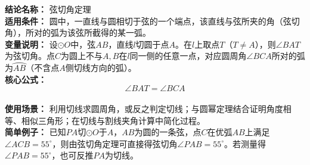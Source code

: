 \textbf{结论名称：} 弦切角定理\\
\textbf{适用条件：} 圆中，一直线与圆相切于弦的一个端点，该直线与弦所夹的角（弦切角），所对的弧为该弦所截得的某一弧。\\
\textbf{变量说明：} 设$\odot O$中，弦$AB$，直线$l$切圆于点$A$。在$l$上取点$T$（$T\neq A$），则$\angle BAT$为弦切角。点$C$为圆上不与$A,B$在$l$同一侧的任意一点，对应圆周角$\angle BCA$所对的弧为$\wideparen{AB}$（不含点$A$侧切线方向的弧）。\\
\textbf{核心公式：} \[ \boxed{\angle BAT = \angle BCA} \]\\
\textbf{使用场景：} 利用切线求圆周角，或反之判定切线；与圆幂定理结合证明角度相等、相似三角形；在切线与割线夹角计算中简化过程。\\
\textbf{简单例子：} 已知$PA$切$\odot O$于$A$，$AB$为圆的一条弦，点$C$在优弧$AB$上满足$\angle ACB = 55^\circ$，则由弦切角定理可直接得弦切角$\angle PAB = 55^\circ$。若测量得$\angle PAB = 55^\circ$，也可反推$PA$为切线。